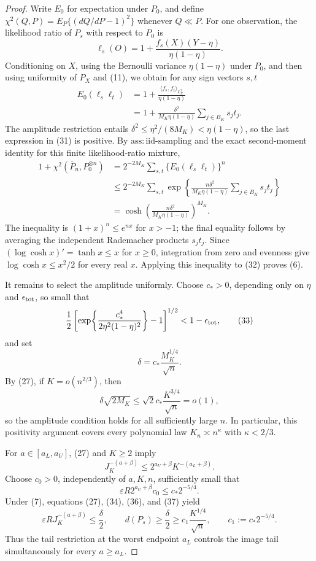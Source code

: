\documentclass{article}
\begin{document}
\begin{proof}
Write \(E_0\) for expectation under \(P_0\), and define \(\chi^2(Q,P)=E_P\{(dQ/dP-1)^2\}\) whenever \(Q\ll P\).  For one observation, the likelihood ratio of \(P_s\) with respect to \(P_0\) is
\[
\ell_s(O)
=1+\frac{f_s(X)(Y-\eta)}{\eta(1-\eta)}.
\tag{30}
\]
Conditioning on \(X\), using the Bernoulli variance \(\eta(1-\eta)\) under \(P_0\), and then using uniformity of \(P_X\) and (11), we obtain for any sign vectors \(s,t\)
\[
\begin{aligned}
E_0(\ell_s\ell_t)
&=1+\frac{\langle f_s,f_t\rangle_{L^2_X}}{\eta(1-\eta)} \\
&=1+\frac{\delta^2}{M_K\eta(1-\eta)}
      \sum_{j\in B_K}s_jt_j.
\end{aligned}
\tag{31}
\]
The amplitude restriction entails \(\delta^2\le\eta^2/(8M_K)<\eta(1-\eta)\), so the last expression in (31) is positive.  By \(\mathrm{ass:iid\mbox{-}sampling}\) and the exact second-moment identity for this finite likelihood-ratio mixture,
\[
\begin{aligned}
1+\chi^2(\overline P_n,P_0^{\otimes n})
&=2^{-2M_K}\sum_{s,t}\{E_0(\ell_s\ell_t)\}^n \\
&\le2^{-2M_K}\sum_{s,t}
\exp\!\left\{
 \frac{n\delta^2}{M_K\eta(1-\eta)}
 \sum_{j\in B_K}s_jt_j
\right\} \\
&=\cosh\!\left(
 \frac{n\delta^2}{M_K\eta(1-\eta)}
\right)^{M_K}.
\end{aligned}
\tag{32}
\]
The inequality is \((1+x)^n\le e^{nx}\) for \(x>-1\); the final equality follows by averaging the independent Rademacher products \(s_jt_j\).  Since \((\log\cosh x)'=\tanh x\le x\) for \(x\ge0\), integration from zero and evenness give \(\log\cosh x\le x^2/2\) for every real \(x\).  Applying this inequality to (32) proves (6).

It remains to select the amplitude uniformly.  Choose \(c_*>0\), depending only on \(\eta\) and \(\epsilon_{\rm tot}\), so small that
\[
\frac12\left[
\exp\!\left\{\frac{c_*^4}{2\eta^2(1-\eta)^2}\right\}-1
\right]^{1/2}<1-\epsilon_{\rm tot},
\tag{33}
\]
and set
\[
\delta=c_*\frac{M_K^{1/4}}{\sqrt n}.
\tag{34}
\]
By (27), if \(K=o(n^{2/3})\), then
\[
\delta\sqrt{2M_K}
\le\sqrt2c_*\frac{K^{3/4}}{\sqrt n}=o(1),
\tag{35}
\]
so the amplitude condition holds for all sufficiently large \(n\).  In particular, this positivity argument covers every polynomial law \(K_n\asymp n^\kappa\) with \(\kappa<2/3\).

For \(a\in[a_L,a_U]\), (27) and \(K\ge2\) imply
\[
J_K^{-(a+\beta)}
\le2^{a_U+\beta}K^{-(a_L+\beta)}.
\tag{36}
\]
Choose \(c_0>0\), independently of \(a,K,n\), sufficiently small that
\[
\varepsilon R2^{a_U+\beta}c_0
\le c_*2^{-5/4}.
\tag{37}
\]
Under (7), equations (27), (34), (36), and (37) yield
\[
\varepsilon RJ_K^{-(a+\beta)}\le\frac\delta2,
\qquad
d(P_s)\ge\frac\delta2
\ge c_1\frac{K^{1/4}}{\sqrt n},
\qquad
c_1:=c_*2^{-5/4}.
\tag{38}
\]
Thus the tail restriction at the worst endpoint \(a_L\) controls the image tail simultaneously for every \(a\ge a_L\).


\end{proof}
\end{document}

